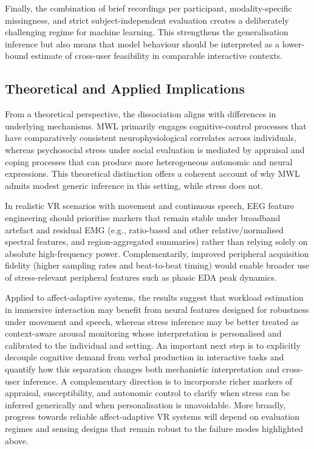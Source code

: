 \documentclass[lettersize,journal]{IEEEtran}
\begin{document}
Finally, the combination of brief recordings per participant, modality-specific missingness, and strict subject-independent evaluation creates a deliberately challenging regime for machine learning. This strengthens the generalisation inference but also means that model behaviour should be interpreted as a lower-bound estimate of cross-user feasibility in comparable interactive contexts.

\subsection{Theoretical and Applied Implications}
From a theoretical perspective, the dissociation aligns with differences in underlying mechanisms. MWL primarily engages cognitive-control processes that have comparatively consistent neurophysiological correlates across individuals, whereas psychosocial stress under social evaluation is mediated by appraisal and coping processes that can produce more heterogeneous autonomic and neural expressions. This theoretical distinction offers a coherent account of why MWL admits modest generic inference in this setting, while stress does not.

In realistic VR scenarios with movement and continuous speech, EEG feature engineering should prioritise markers that remain stable under broadband artefact and residual EMG (e.g., ratio-based and other relative/normalised spectral features, and region-aggregated summaries) rather than relying solely on absolute high-frequency power. Complementarily, improved peripheral acquisition fidelity (higher sampling rates and beat-to-beat timing) would enable broader use of stress-relevant peripheral features such as phasic EDA peak dynamics.

Applied to affect-adaptive systems, the results suggest that workload estimation in immersive interaction may benefit from neural features designed for robustness under movement and speech, whereas stress inference may be better treated as context-aware arousal monitoring whose interpretation is personalised and calibrated to the individual and setting. An important next step is to explicitly decouple cognitive demand from verbal production in interactive tasks and quantify how this separation changes both mechanistic interpretation and cross-user inference. A complementary direction is to incorporate richer markers of appraisal, susceptibility, and autonomic control to clarify when stress can be inferred generically and when personalisation is unavoidable. More broadly, progress towards reliable affect-adaptive VR systems will depend on evaluation regimes and sensing designs that remain robust to the failure modes highlighted above.
\end{document}
